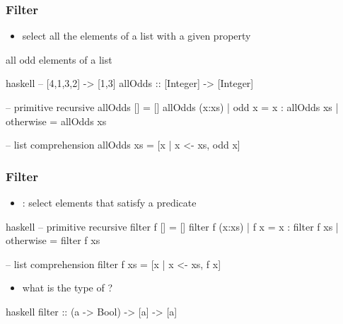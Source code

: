 \documentclass[dvipsnames]{beamer}
\theoremstyle{plain}
\begin{document}
\begin{frame}[fragile]
  \frametitle{Filter}

  \begin{itemize}
    \item select all the elements of a list with a given property
  \end{itemize}

  \begin{exampleblock}{all odd elements of a list}
    \begin{pygments}{haskell}
-- [4,1,3,2] -> [1,3]
allOdds :: [Integer] -> [Integer]

-- primitive recursive
allOdds []     = []
allOdds (x:xs)
  | odd x      = x : allOdds xs
  | otherwise  = allOdds xs

-- list comprehension
allOdds xs = [x | x <- xs, odd x]
    \end{pygments}
  \end{exampleblock}
\end{frame}

\begin{frame}[fragile]
  \frametitle{Filter}

  \begin{itemize}
    \item {}: select elements that satisfy a predicate
  \end{itemize}

  \begin{exampleblock}{}
    \begin{pygments}{haskell}
-- primitive recursive
filter f []     = []
filter f (x:xs)
  | f x       = x : filter f xs
  | otherwise = filter f xs

-- list comprehension
filter f xs = [x | x <- xs, f x]
    \end{pygments}
  \end{exampleblock}

  \pause
  \begin{itemize}
    \item what is the type of ?
  \end{itemize}

  \begin{pygments}{haskell}
filter :: (a -> Bool) -> [a] -> [a]
  \end{pygments}
\end{frame}
\end{document}
